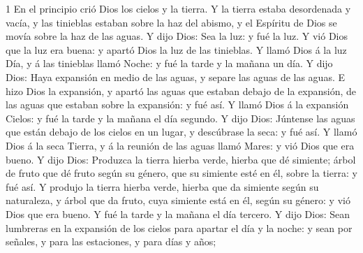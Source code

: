 \blStartBook





\lettrine{1}{}
En el principio crió Dios los cielos y la tierra. 
Y la tierra estaba desordenada y vacía, y las tinieblas estaban sobre la haz del abismo, y el Espíritu de Dios se movía sobre la haz de las aguas. 
Y dijo Dios: Sea la luz: y fué la luz. 
Y vió Dios que la luz era buena: y apartó Dios la luz de las tinieblas. 
Y llamó Dios á la luz Día, y á las tinieblas llamó Noche: y fué la tarde y la mañana un día. 
Y dijo Dios: Haya expansión en medio de las aguas, y separe las aguas de las aguas. 
E hizo Dios la expansión, y apartó las aguas que estaban debajo de la expansión, de las aguas que estaban sobre la expansión: y fué así. 
Y llamó Dios á la expansión Cielos: y fué la tarde y la mañana el día segundo. 
Y dijo Dios: Júntense las aguas que están debajo de los cielos en un lugar, y descúbrase la seca: y fué así. 
Y llamó Dios á la seca Tierra, y á la reunión de las aguas llamó Mares: y vió Dios que era bueno. 
Y dijo Dios: Produzca la tierra hierba verde, hierba que dé simiente; árbol de fruto que dé fruto según su género, que su simiente esté en él, sobre la tierra: y fué así. 
Y produjo la tierra hierba verde, hierba que da simiente según su naturaleza, y árbol que da fruto, cuya simiente está en él, según su género: y vió Dios que era bueno. 
Y fué la tarde y la mañana el día tercero. 
Y dijo Dios: Sean lumbreras en la expansión de los cielos para apartar el día y la noche: y sean por señales, y para las estaciones, y para días y años; 
